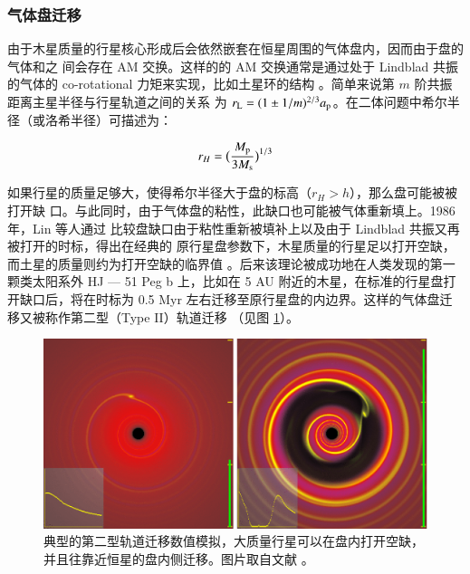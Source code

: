 \subsubsection{气体盘迁移} \label{sec:diskmig}

由于木星质量的行星核心形成后会依然嵌套在恒星周围的气体盘内，因而由于盘的气体和之
间会存在 AM 交换。这样的的 AM 交换通常是通过处于 Lindblad 共振的气体的 co-rotational 
力矩来实现\cite{Binney1987,GoldreichTremaine1979}，比如土星环的结构
\cite{GoldreichTremaine1980}。简单来说第 $m$ 阶共振距离主星半径与行星轨道之间的关系
为 $r_\mathrm{L} = (1\pm 1/m)^{2/3} a_\mathrm{p}$。在二体问题中希尔半径（或洛希半径）可描述为：

\begin{equation} \label{eq:hillradius}
r_H = \big( \frac{M_\mathrm{p}}{3M_\mathrm{s}} \big) ^{1/3}
\end{equation} %

如果行星的质量足够大，使得希尔半径大于盘的标高（$r_H > h$），那么盘可能被被打开缺
口。与此同时，由于气体盘的粘性，此缺口也可能被气体重新填上。1986 年，Lin 等人通过
比较盘缺口由于粘性重新被填补上以及由于 Lindblad 共振又再被打开的时标，得出在经典的
原行星盘参数下，木星质量的行星足以打开空缺，而土星的质量则约为打开空缺的临界值
\cite{Lin1986,Ward1997}。后来该理论被成功地在人类发现的第一颗类太阳系外 HJ --- 51 Peg
 b 上\cite{Lin1996}，比如在 5 AU 附近的木星，在标准的行星盘打开缺口后，将在时标为 0.5 
 Myr 左右迁移至原行星盘的内边界。这样的气体盘迁移又被称作第二型（Type II）轨道迁移
 （见图 \ref{fig:diskmig}）。

\begin{figure}[t]
\centering
\includegraphics[width=1.0\textwidth]{figures/chapter4/fig3_diskmig.eps}
\caption[典型的第二型轨道迁移数值模拟，大质量行星可以在盘内打开空缺，并且往靠近恒星的盘内侧迁移。图片版权 Armitage\/Rice。]{典型的第二型轨道迁移数值模拟，大质量行星可以在盘内打开空缺，并且往靠近恒星的盘内侧迁移。图片取自文献 。}
\label{fig:diskmig}
\end{figure}


